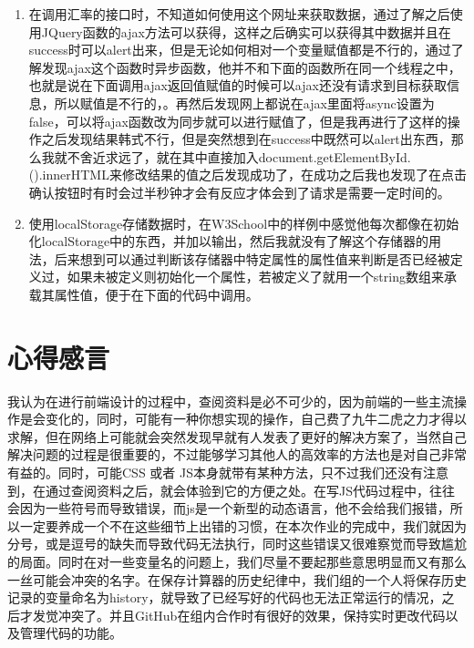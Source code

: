\documentclass[hyperref,UTF8]{ctexart}
\begin{document}
\begin{enumerate}

\item
在调用汇率的接口时，不知道如何使用这个网址来获取数据，通过了解之后使用JQuery函数的ajax方法可以获得，这样之后确实可以获得其中数据并且在success时可以alert出来，但是无论如何相对一个变量赋值都是不行的，通过了解发现ajax这个函数时异步函数，他并不和下面的函数所在同一个线程之中，也就是说在下面调用ajax返回值赋值的时候可以ajax还没有请求到目标获取信息，所以赋值是不行的，。再然后发现网上都说在ajax里面将async设置为false，可以将ajax函数改为同步就可以进行赋值了，但是我再进行了这样的操作之后发现结果韩式不行，但是突然想到在success中既然可以alert出东西，那么我就不舍近求远了，就在其中直接加入document.getElementById.().innerHTML来修改结果的值之后发现成功了，在成功之后我也发现了在点击确认按钮时有时会过半秒钟才会有反应才体会到了请求是需要一定时间的。

\item
使用localStorage存储数据时，在W3School中的样例中感觉他每次都像在初始化localStorage中的东西，并加以输出，然后我就没有了解这个存储器的用法，后来想到可以通过判断该存储器中特定属性的属性值来判断是否已经被定义过，如果未被定义则初始化一个属性，若被定义了就用一个string数组来承载其属性值，便于在下面的代码中调用。


\end{enumerate}

\newpage

\section{心得感言}
我认为在进行前端设计的过程中，查阅资料是必不可少的，因为前端的一些主流操作是会变化的，同时，可能有一种你想实现的操作，自己费了九牛二虎之力才得以求解，但在网络上可能就会突然发现早就有人发表了更好的解决方案了，当然自己解决问题的过程是很重要的，不过能够学习其他人的高效率的方法也是对自己非常有益的。同时，可能CSS 或者 JS本身就带有某种方法，只不过我们还没有注意到，在通过查阅资料之后，就会体验到它的方便之处。在写JS代码过程中，往往会因为一些符号而导致错误，而js是一个新型的动态语言，他不会给我们报错，所以一定要养成一个不在这些细节上出错的习惯，在本次作业的完成中，我们就因为分号，或是逗号的缺失而导致代码无法执行，同时这些错误又很难察觉而导致尴尬的局面。同时在对一些变量名的问题上，我们尽量不要起那些意思明显而又有那么一丝可能会冲突的名字。在保存计算器的历史纪律中，我们组的一个人将保存历史记录的变量命名为history，就导致了已经写好的代码也无法正常运行的情况，之后才发觉冲突了。并且GitHub在组内合作时有很好的效果，保持实时更改代码以及管理代码的功能。
\end{document}
